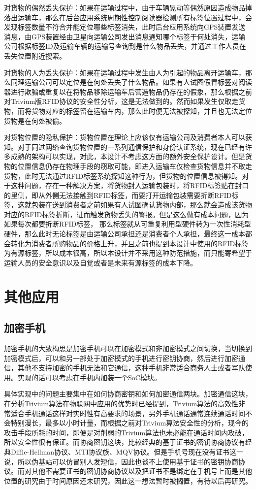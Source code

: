 对货物的偶然丢失保护：如果在运输过程中，由于车辆晃动等偶然原因造成物品掉落出运输车，那么在后台应用系统周期性控制阅读器检测所有标签位置过程中，会发现标签数量不符合并能定位哪些标签消失，此时后台应用系统向GPS装置发送消息，由GPS装置经由卫星向运输公司发出消息通知哪个标签于何处消失，运输公司根据标签ID及运输车辆的运输号查询到是什么物品丢失，并通过工作人员在丢失位置附近搜索。

对货物的人为丢失保护：如果在运输过程中发生由人为引起的物品离开运输车，那么同理运输公司可以定位是在何处丢失了什么物品。如果有人试图假冒标签对阅读器进行欺骗或重复以在将物品移除运输车后营造物品仍存在的假象，那么根据之前对Trivium版RFID协议的安全性分析，这是无法做到的。然而如果发生仅取走货物，而将货物对应的标签留在运输车内，那么此时便无法被探知，并且也无法定位货物是在何处被偷。

对货物位置的隐私保护：货物位置在理论上应该仅有运输公司及消费者本人可以获知。对于同过网络查询货物位置的一系列通信保护和身份认证系统，现在已经有许多成熟的架构可以实现，对此，本设计不考虑这方面的额外安全保护设计。但是货物的位置信息仍存在物理手段的窃取可能，即进入运输车仅检查货物信息并不取走货物，此时无法通过RFID标签系统探知这种行为，但货物的位置信息被得知。对于这种问题，存在一种解决方案，将货物封入运输包装时，将RFID标签贴在封口的里侧，即从外侧无法接触到RFID标签，而要打开运输包装需要折断RFID标签，这就包装在送到消费者之前如果有人试图确认货物内部，那么就会造成该货物对应的RFID标签折断，进而触发货物丢失的警报。但是这么做有成本问题，因为如果每次都要折断RFID标签， 那么标签就从可重复利用型硬件转为一次性消耗型硬件，那么此时无论标签是由运输公司承担还是消费者个人承担，最终这一成本都会转化为消费者所购物品的价格上升，并且之前也提到本设计中使用的RFID标签为有源标签，所以成本很高，所以本设计并不采用这种防范措施，而只能寄希望于运输人员的安全意识以及自觉或者是未来有源标签的成本下降。

\section{其他应用}

\subsection{加密手机}

加密手机的大致构思是加密手机可以在加密模式和非加密模式之间切换，当切换到加密模式后，可以和另一部处于加密模式的手机进行密钥协商，然后进行加密通信，其他不支持加密的手机无法和它通信，这种手机非常适合商务人士或者军队使用。实现的话可以考虑在手机内加装一个SoC模块。

具体实现中的问题主要集中在如何协商密钥和如何加密通信两块。加密通信这块，在分析Trivium算法在物联网中应用的优势时已经提到，Trivium算法的高效性非常适合手机通话这样对实时性有高要求的场景，另外手机通话通常连续通话时间不会特别漫长，最多以小时计量，而根据之前对Trivium算法安全性的分析，现今的攻击手段所耗的时间，即便是对削弱的Trivium算法也未必能在通话时间内攻破，所以安全性很有保证。而协商密钥这块，比较经典的基于证书的密钥协商协议有经典Diffie-Hellman协议、MTI协议族、MQV协议。但是手机号现在没有证书这一说，所以伪基站可以仿冒别人发短信，因此也谈不上使用基于证书的密钥协商协议。而对其他不需要证书的密钥协商协议以及把证书不是绑定在手机号上而是其他位置的研究由于时间原因还未研究，因此这一想法暂时被搁置，有待以后再研究。

